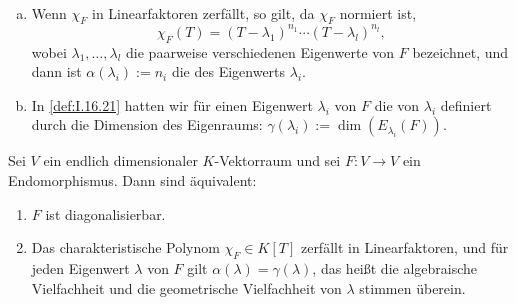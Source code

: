 \begin{erinnerung}
	\label{erinnerung:2.7}
	\mbox{} \\[-1.4cm]
	\begin{enumerate}[(a)]
		\item Wenn $\chi_F$ in Linearfaktoren zerfällt, so gilt, da $\chi_F$ normiert ist,
		\[
			\chi_F(T) = (T-\lambda_1)^{n_1} \cdots (T-\lambda_l)^{n_l},
		\]
		wobei $\lambda_1,\dots,\lambda_l$ die paarweise verschiedenen Eigenwerte von $F$ bezeichnet, und dann ist $\alpha(\lambda_i) := n_i$ die  des Eigenwerts $\lambda_i$.
		\item In \autoref{def:I.16.21} hatten wir für einen Eigenwert $\lambda_i$ von $F$ die  von $\lambda_i$ definiert durch die Dimension des Eigenraums: $\gamma(\lambda_i) := \dim(E_{\lambda_i}(F))$.
	\end{enumerate}
\end{erinnerung}

\begin{satz}
	\label{satz:2.8}
	Sei $V$ ein endlich dimensionaler $K$-Vektorraum und sei $F \colon V \rightarrow V$ ein Endomorphismus.
	Dann sind äquivalent:
	\begin{enumerate}[(1)]
		\item $F$ ist diagonalisierbar.
		\item Das charakteristische Polynom $\chi_F \in K[T]$ zerfällt in Linearfaktoren, und für jeden Eigenwert $\lambda$ von $F$ gilt $\alpha(\lambda) = \gamma(\lambda)$, das heißt die algebraische Vielfachheit und die geometrische Vielfachheit von $\lambda$ stimmen überein.
	\end{enumerate}
\end{satz}

